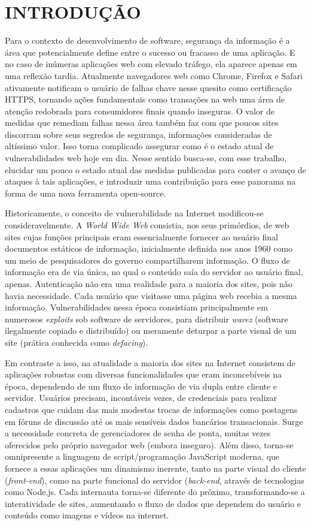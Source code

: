 \chapter{INTRODUÇÃO}

Para o contexto de desenvolvimento de software, segurança da informação é a área que potencialmente define entre o sucesso ou fracasso de uma aplicação. E no caso de inúmeras aplicações web com elevado tráfego, ela aparece apenas em uma reflexão tardia. Atualmente navegadores web como Chrome, Firefox e Safari ativamente notificam o usuário de falhas chave nesse quesito como certificação HTTPS, tornando ações fundamentais como transações na web uma área de atenção redobrada para consumidores finais quando inseguras. O valor de medidas que remediam falhas nessa área também faz com que poucos sites discorram sobre seus segredos de segurança, informações consideradas de altíssimo valor. Isso torna complicado assegurar como é o estado atual de vulnerabilidades web hoje em dia. Nesse sentido busca-se, com esse trabalho, elucidar um pouco o estado atual das medidas publicadas para conter o avanço de ataques à tais aplicações, e introduzir uma contribuição para esse panorama na forma de uma nova ferramenta open-source.

Historicamente, o conceito de vulnerabilidade na Internet modificou-se consideravelmente. A \textit{World Wide Web} consistia, nos seus primórdios, de web sites cujas funções principais eram essencialmente fornecer ao usuário final documentos estáticos de informação, inicialmente definida nos anos 1960 como um meio de pesquisadores do governo compartilharem informação. O fluxo de informação era de via única, no qual o conteúdo saía do servidor ao usuário final, apenas. Autenticação não era uma realidade para a maioria dos sites, pois não havia necessidade. Cada usuário que visitasse uma página web recebia a mesma informação. Vulnerabilidades nessa época consistiam principalmente em numerosos \textit{exploits} sob software de servidores, para distribuir \textit{warez} (software ilegalmente copiado e distribuído) ou meramente deturpar a parte visual de um site (prática conhecida como \textit{defacing}).

Em contraste a isso, na atualidade a maioria dos sites na Internet consistem de aplicações robustas com diversas funcionalidades que eram inconcebíveis na época, dependendo de um fluxo de informação de via dupla entre cliente e servidor. Usuários precisam, incontáveis vezes, de credenciais para realizar cadastros que cuidam das mais modestas trocas de informações como postagens em fóruns de discussão até os mais sensíveis dados bancários transacionais. Surge a necessidade concreta de gerenciadores de senha de ponta, muitas vezes oferecidos pelo próprio navegador web (embora inseguro). Além disso, torna-se omnipresente a linguagem de script/programação JavaScript moderna, que fornece a essas aplicações um dinamismo inerente, tanto na parte visual do cliente (\textit{front-end}), como na parte funcional do servidor (\textit{back-end}, através de tecnologias como Node.js. Cada internauta torna-se diferente do próximo, transformando-se a interatividade de sites, aumentando o fluxo de dados que dependem do usuário e conteúdo como imagens e vídeos na internet.

